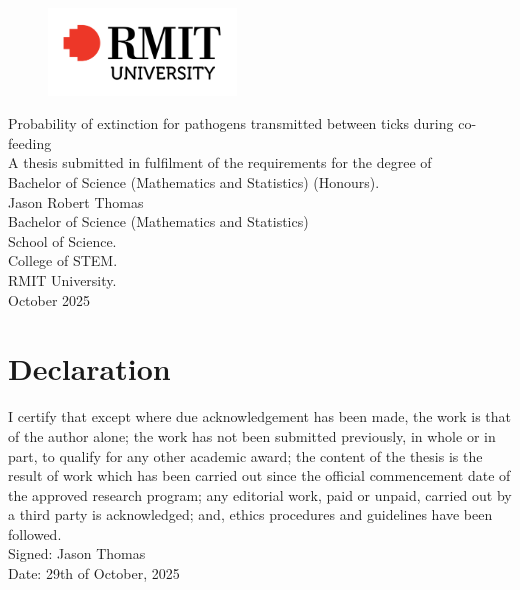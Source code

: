 \documentclass{article}
\begin{document}
\begin{titlepage}
\begin{figure}[t!]
\centering
\includegraphics[width=5cm]{rmit-logo}
\end{figure}

\vspace*{2cm}

\begin{center}
{\large
	Probability of extinction for pathogens transmitted between ticks during co-feeding\\
	[1cm]
	A thesis submitted in fulfilment of the requirements for the degree of \\
    Bachelor of Science (Mathematics and Statistics) (Honours).\\
	[2cm]
	Jason Robert Thomas\\
	[0.5cm]
	Bachelor of Science (Mathematics and Statistics) \\
	[3cm]
	School of Science.\\
	[0.5cm]
	College of STEM.\\
	[0.5cm]
	RMIT University.\\
	[2cm]
	October 2025\\
}
\end{center}
	
\end{titlepage}

\section*{Declaration}
I certify that except where due acknowledgement has been made, the work is that of the author alone; the work has not been submitted previously, in whole or in part, to qualify for any other academic award; the content of the thesis is the result of work which has been carried out since the official commencement date of the approved research program; any editorial work, paid or unpaid, carried out by a third party is acknowledged; and, ethics procedures and guidelines have been followed. \\
[1cm]
Signed: Jason Thomas\\
[1cm]
Date: 29th of October, 2025\\
\end{document}
